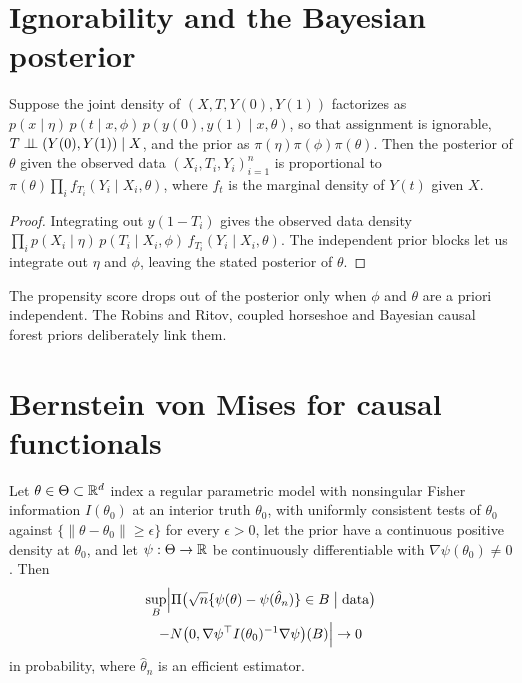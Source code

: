 \section{Ignorability and the Bayesian posterior}

\begin{proposition}
Suppose the joint density of $(X, T, Y(0), Y(1))$ factorizes as $p(x \mid \eta)\,p(t \mid x, \phi)\,p(y(0), y(1) \mid x, \theta)$, so that assignment is ignorable, $T \perp\!\!\!\perp (Y(0), Y(1)) \mid X$, and the prior as $\pi(\eta)\pi(\phi)\pi(\theta)$. Then the posterior of $\theta$ given the observed data $(X_i, T_i, Y_i)_{i=1}^n$ is proportional to $\pi(\theta)\prod_i f_{T_i}(Y_i \mid X_i, \theta)$, where $f_t$ is the marginal density of $Y(t)$ given $X$.
\end{proposition}

\begin{proof}
Integrating out $y(1-T_i)$ gives the observed data density $\prod_i p(X_i \mid \eta)\,p(T_i \mid X_i,\phi)\,f_{T_i}(Y_i \mid X_i,\theta)$. The independent prior blocks let us integrate out $\eta$ and $\phi$, leaving the stated posterior of $\theta$.
\end{proof}

The propensity score drops out of the posterior only when $\phi$ and $\theta$ are a priori independent. The Robins and Ritov, coupled horseshoe and Bayesian causal forest priors deliberately link them.

\section{Bernstein von Mises for causal functionals}

\begin{theorem}
Let $\theta \in \Theta \subset \mathbb{R}^d$ index a regular parametric model with nonsingular Fisher information $I(\theta_0)$ at an interior truth $\theta_0$, with uniformly consistent tests of $\theta_0$ against $\{\lVert\theta - \theta_0\rVert \ge \epsilon\}$ for every $\epsilon > 0$, let the prior have a continuous positive density at $\theta_0$, and let $\psi: \Theta \to \mathbb{R}$ be continuously differentiable with $\nabla\psi(\theta_0) \neq 0$. Then
\begin{multline*}
\sup_B \Bigl|\Pi\bigl(\sqrt{n}\{\psi(\theta) - \psi(\hat\theta_n)\} \in B \bigm| \text{data}\bigr) \\
- N\bigl(0, \nabla\psi^\top I(\theta_0)^{-1}\nabla\psi\bigr)(B)\Bigr| \to 0
\end{multline*}
in probability, where $\hat\theta_n$ is an efficient estimator.
\end{theorem}

